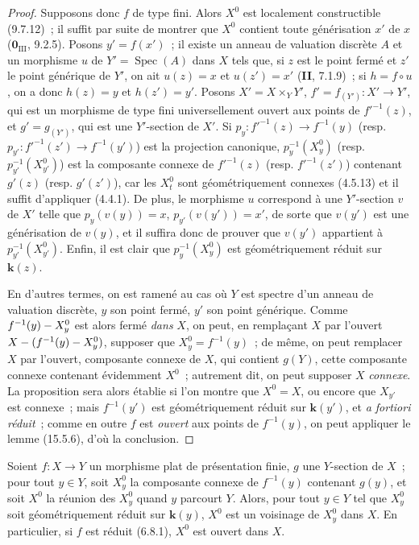 \begin{proof}
Supposons donc $f$ de type fini. Alors $X^0$ est localement constructible (9.7.12)~; il suffit par suite de montrer que $X^0$ contient toute générisation $x'$ de $x$ ($\mathbf{0}_{\mathrm{III}}$, 9.2.5). Posons $y'=f(x')$~; il existe un anneau de valuation discrète $A$ et un morphisme $u$ de $Y'=\operatorname{Spec}(A)$ dans $X$ tels que, si $z$ est le point fermé et $z'$ le point générique de $Y'$, on ait $u(z)=x$ et $u(z')=x'$ (\textbf{II}, 7.1.9)~; si $h=f\circ u$, on a donc $h(z)=y$ et $h(z')=y'$. Posons $X'=X\times_Y Y'$, $f'=f_{(Y')}:X'\to Y'$, qui est un morphisme de type fini universellement ouvert aux points de $f'^{-1}(z)$, et $g'=g_{(Y')}$, qui est une $Y'$-section de $X'$. Si $p_y:f'^{-1}(z)\to f^{-1}(y)$ (resp. $p_{y'}:f'^{-1}(z')\to f^{-1}(y')$) est la projection canonique, $p_y^{-1}(X_y^0)$ (resp. $p_{y'}^{-1}(X_{y'}^0)$) est la composante connexe de $f'^{-1}(z)$ (resp. $f'^{-1}(z')$) contenant $g'(z)$ (resp. $g'(z')$), car les $X_t^0$ sont géométriquement connexes (4.5.13) et il suffit d'appliquer (4.4.1). De plus, le morphisme $u$ correspond à une $Y'$-section $v$ de $X'$ telle que $p_y(v(y))=x$, $p_{y'}(v(y'))=x'$, de sorte que $v(y')$ est une générisation de $v(y)$, et il suffira donc de prouver que $v(y')$ appartient à $p_{y'}^{-1}(X_{y'}^0)$. Enfin, il est clair que $p_y^{-1}(X_y^0)$ est géométriquement réduit sur $\boldsymbol{k}(z)$.

En d'autres termes, on est ramené au cas où $Y$ est spectre d'un anneau de valuation discrète, $y$ son point fermé, $y'$ son point générique. Comme $f^{-1}(y)- X_y^0$ est alors fermé \emph{dans} $X$, on peut, en remplaçant $X$ par l'ouvert $X-(f^{-1}(y)- X_y^0)$, supposer que $X_y^0=f^{-1}(y)$~; de même, on peut remplacer $X$ par l'ouvert, composante connexe de $X$, qui contient $g(Y)$, cette composante connexe contenant évidemment $X^0$~; autrement dit, on peut supposer $X$ \emph{connexe}. La proposition sera alors établie si l'on montre que $X^0=X$, ou encore que $X_{y'}$ est connexe~; mais $f^{-1}(y')$ est géométriquement réduit sur $\boldsymbol{k}(y')$, et \emph{a fortiori réduit}~; comme en outre $f$ est \emph{ouvert} aux points de $f^{-1}(y)$, on peut appliquer le lemme (15.5.6), d'où la conclusion.
\end{proof}

\begin{corollary}[15.6.5]
\label{IV.15.6.5-fr}
Soient $f:X\to Y$ un morphisme plat de présentation finie, $g$ une $Y$-section de $X$~; pour tout $y\in Y$, soit $X_y^0$ la composante connexe de $f^{-1}(y)$ contenant $g(y)$, et soit $X^0$ la réunion des $X_y^0$ quand $y$ parcourt $Y$. Alors, pour tout $y\in Y$ tel que $X_y^0$ soit géométriquement réduit sur $\boldsymbol{k}(y)$, $X^0$ est un voisinage de $X_y^0$ dans $X$. En particulier, si $f$ est réduit \textup{(6.8.1)}, $X^0$ est ouvert dans $X$.
\end{corollary}

